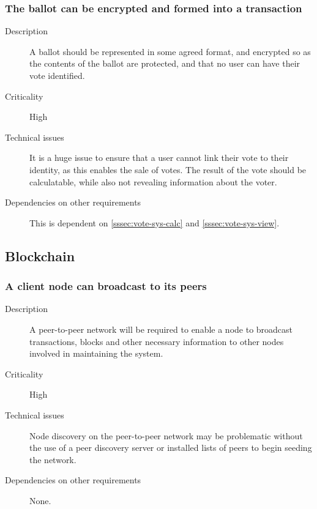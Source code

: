 \documentclass[a4paper,12pt]{article}
\begin{document}
\subsubsection{The ballot can be encrypted and formed into a transaction}
\label{sssec:ballot-enc-trans}
\begin{description}
	\item[Description]
		A ballot should be represented in some agreed format, and encrypted so as the contents of the ballot are protected, and that no user can have their vote identified.
	\item[Criticality]
		High
	\item[Technical issues]
		It is a huge issue to ensure that a user cannot link their vote to their identity, as this enables the sale of votes. The result of the vote should be calculatable, while also not revealing information about the voter. 
	\item[Dependencies on other requirements]
		This is dependent on \ref{sssec:vote-sys-calc} and \ref{sssec:vote-sys-view}.
\end{description}

\subsection{Blockchain}
\label{subsec:blockchain}

\subsubsection{A client node can broadcast to its peers}
\label{sssec:blk-comms}
\begin{description}
	\item[Description]
		A peer-to-peer network will be required to enable a node to broadcast transactions, blocks and other necessary information to other nodes involved in maintaining the system.
	\item[Criticality]
		High
	\item[Technical issues]
		Node discovery on the peer-to-peer network may be problematic without the use of a peer discovery server or installed lists of peers to begin seeding the network.
	\item[Dependencies on other requirements]
		None.
\end{description}
\end{document}
